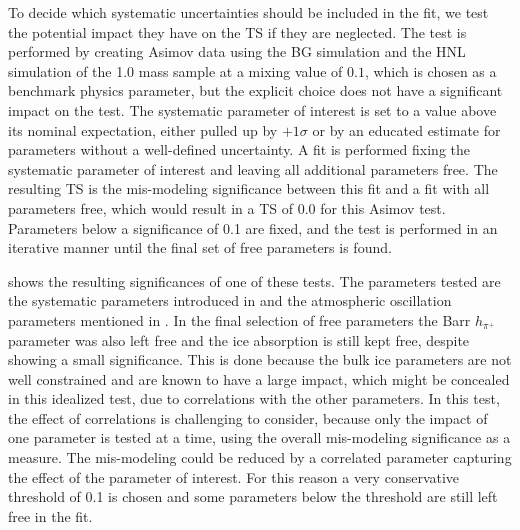 To decide which systematic uncertainties should be included in the fit, we test the potential impact they have on the TS if they are neglected. The test is performed by creating Asimov data using the BG simulation and the HNL simulation of the \SI{1.0}{\gev} mass sample at a mixing value of $0.1$, which is chosen as a benchmark physics parameter, but the explicit choice does not have a significant impact on the test. The systematic parameter of interest is set to a value above its nominal expectation, either pulled up by $+1\sigma$ or by an educated estimate for parameters without a well-defined uncertainty. A fit is performed fixing the systematic parameter of interest and leaving all additional parameters free. The resulting TS is the mis-modeling significance between this fit and a fit with all parameters free, which would result in a TS of 0.0 for this Asimov test. Parameters below a significance of \SI{0.1}{\sigma} are fixed, and the test is performed in an iterative manner until the final set of free parameters is found.

 shows the resulting significances of one of these tests. The parameters tested are the systematic parameters introduced in  and the atmospheric oscillation parameters mentioned in . In the final selection of free parameters the Barr $h_{\pi^+}$ parameter was also left free and the ice absorption is still kept free, despite showing a small significance. This is done because the bulk ice parameters are not well constrained and are known to have a large impact, which might be concealed in this idealized test, due to correlations with the other parameters. In this test, the effect of correlations is challenging to consider, because only the impact of one parameter is tested at a time, using the overall mis-modeling significance as a measure. The mis-modeling could be reduced by a correlated parameter capturing the effect of the parameter of interest. For this reason a very conservative threshold of \SI{0.1}{\sigma} is chosen and some parameters below the threshold are still left free in the fit.

